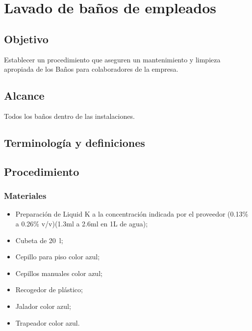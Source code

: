 \renewcommand{\MenorVer}{0}
\renewcommand{\MayorVer}{2}
\renewcommand{\Codigo}{HYS-16-IT}
\renewcommand{\FechaPub}{2023--01}
\renewcommand{\Titulo}{Lavado de baños de empleados}

\section{\Titulo}

\subsection{Objetivo}

Establecer un procedimiento que aseguren un mantenimiento y limpieza apropiada de los Baños para colaboradores de la empresa.

\subsection{Alcance}

Todos los baños dentro de las instalaciones.

\subsection{Terminología y definiciones}

\begin{description}
\end{description}



\subsection{Procedimiento}

\subsubsection{Materiales}

\begin{itemize}
	\item Preparación de Liquid K a la concentración indicada por el proveedor (0.13\% a 0.26\% v/v)(1.3ml a 2.6ml en 1L de agua);
	\item Cubeta de \qty{20}{\litre};
	\item Cepillo para piso color azul;
	\item Cepillos manuales color azul;
	\item Recogedor de plástico;
	\item Jalador color azul;
	\item Trapeador color azul.
\end{itemize}

